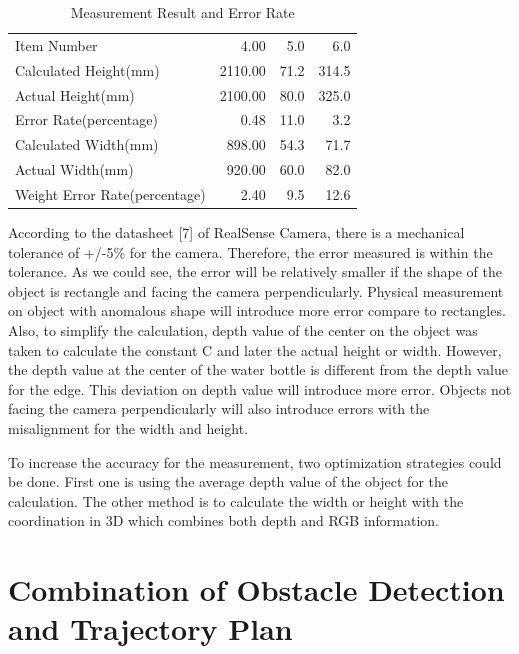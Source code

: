 \documentclass[
  oneside]{ubcthesis}
\begin{document}
\begin{table}

\caption{\label{tab:mytable3}Measurement Result and Error Rate}
\centering
\begin{tabular}[t]{lrrr}
\toprule
Item Number & 4.00 & 5.0 & 6.0\\
Calculated Height(mm) & 2110.00 & 71.2 & 314.5\\
Actual Height(mm) & 2100.00 & 80.0 & 325.0\\
Error Rate(percentage) & 0.48 & 11.0 & 3.2\\
Calculated Width(mm) & 898.00 & 54.3 & 71.7\\
\addlinespace
Actual Width(mm) & 920.00 & 60.0 & 82.0\\
Weight Error Rate(percentage) & 2.40 & 9.5 & 12.6\\
\bottomrule
\end{tabular}
\end{table}

According to the datasheet {[}7{]} of RealSense Camera, there is a mechanical tolerance of +/-5\% for the camera. Therefore, the error measured is within the tolerance. As we could see, the error will be relatively smaller if the shape of the object is rectangle and facing the camera perpendicularly. Physical measurement on object with anomalous shape will introduce more error compare to rectangles. Also, to simplify the calculation, depth value of the center on the object was taken to calculate the constant C and later the actual height or width. However, the depth value at the center of the water bottle is different from the depth value for the edge. This deviation on depth value will introduce more error. Objects not facing the camera perpendicularly will also introduce errors with the misalignment for the width and height.

To increase the accuracy for the measurement, two optimization strategies could be done. First one is using the average depth value of the object for the calculation. The other method is to calculate the width or height with the coordination in 3D which combines both depth and RGB information.

\hypertarget{combination-of-obstacle-detection-and-trajectory-plan}{%
\section{Combination of Obstacle Detection and Trajectory Plan}\label{combination-of-obstacle-detection-and-trajectory-plan}}
\end{document}
